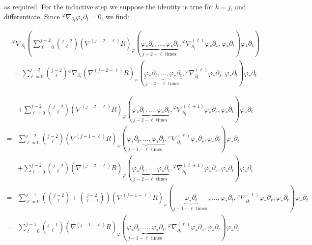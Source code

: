 \documentclass[10pt, letterpaper]{article}
\begin{document}
as required. For the inductive step we suppose the identity is true for $k=j$, and differentiate. Since ${ }^{\varphi} \nabla_{\partial_{t}} \varphi_{*} \partial_{t}=0$, we find:

$$
\begin{aligned}
& { }^{\varphi} \nabla_{\partial_{t}}(\sum_{\ell=0}^{j-2}\binom{j-2}{\ell}\left(\nabla^{(j-2-\ell)} R\right)_{\varphi}(\underbrace{\varphi_{*} \partial_{t}, \ldots, \varphi_{*} \partial_{t}}_{j-2-\ell \text { times }},{ }^{\varphi} \nabla_{\partial_{t}}^{(\ell)} \varphi_{*} \partial_{s}, \varphi_{*} \partial_{t}) \varphi_{*} \partial_{t}) \\
& =\sum_{\ell=0}^{j-2}\binom{j-2}{\ell}{ }^{\varphi} \nabla_{\partial_{t}}\left(\nabla^{(j-2-\ell)} R\right)_{\varphi}(\underbrace{\varphi_{*} \partial_{t}, \ldots, \varphi_{*} \partial_{t}}_{j-2-\ell \text { times }},{ }^{\varphi} \nabla_{\partial_{t}}^{(\ell)} \varphi_{*} \partial_{s}, \varphi_{*} \partial_{t}) \varphi_{*} \partial_{t}
\end{aligned}
$$

$$
\begin{aligned}
& +\sum_{\ell=0}^{j-2}\binom{j-2}{\ell}\left(\nabla^{(j-2-\ell)} R\right)_{\varphi}(\underbrace{\varphi_{*} \partial_{t}, \ldots, \varphi_{*} \partial_{t}}_{j-2-\ell \text { times }},{ }^{\varphi} \nabla_{\partial_{t}}^{(\ell+1)} \varphi_{*} \partial_{s}, \varphi_{*} \partial_{t}) \varphi_{*} \partial_{t} \\
= & \sum_{\ell=0}^{j-2}\binom{j-2}{\ell}\left(\nabla^{(j-1-\ell)} R\right)_{\varphi}(\underbrace{\varphi_{*} \partial_{t}, \ldots, \varphi_{*} \partial_{t}}_{j-1-\ell \text { times }},{ }^{\varphi} \nabla_{\partial_{t}}^{(\ell)} \varphi_{*} \partial_{s}, \varphi_{*} \partial_{t}) \varphi_{*} \partial_{t} \\
& +\sum_{\ell=0}^{j-2}\binom{j-2}{\ell}\left(\nabla^{(j-2-\ell)} R\right)_{\varphi}(\underbrace{\varphi_{*} \partial_{t}, \ldots, \varphi_{*} \partial_{t}}_{j-2-\ell \text { times }},{ }^{\varphi} \nabla_{\partial_{t}}^{(\ell+1)} \varphi_{*} \partial_{s}, \varphi_{*} \partial_{t}) \varphi_{*} \partial_{t} \\
= & \sum_{\ell=0}^{j-1}\left(\binom{j-2}{\ell}+\binom{j-2}{\ell-1}\right)\left(\nabla^{(j-1-\ell)} R\right)_{\varphi}(\underbrace{\varphi_{*} \partial_{t}}_{j-1-\ell \text { times }}, \ldots, \varphi_{*} \partial_{t},{ }^{\varphi} \nabla_{\partial_{t}}^{(\ell)} \varphi_{*} \partial_{s}, \varphi_{*} \partial_{t}) \varphi_{*} \partial_{t} \\
= & \sum_{\ell=0}^{j-1}\binom{j-1}{\ell}\left(\nabla^{(j-1-\ell)} R\right)_{\varphi}(\underbrace{\varphi_{*} \partial_{t}, \ldots, \varphi_{*} \partial_{t}}_{j-1-\ell \text { times }},{ }^{\varphi} \nabla_{\partial_{t}}^{(\ell)} \varphi_{*} \partial_{s}, \varphi_{*} \partial_{t}) \varphi_{*} \partial_{t}
\end{aligned}
$$
\end{document}
